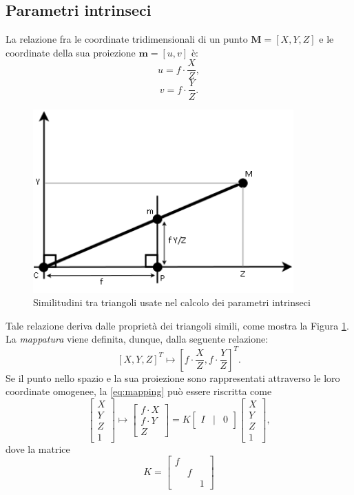 \subsection{Parametri intrinseci}
\label{intrinsicParam}
La relazione fra le coordinate tridimensionali di un punto $\textbf{M}=[X,Y,Z]$ e le coordinate della sua proiezione $\textbf{m}=[u,v]$ \`e:
\[u=f\cdot \frac{X}{Z},\]
\[v=f\cdot \frac{Y}{Z}.\]
\begin{figure}[tb]
	\centering
	\includegraphics[width=10cm]{./pictures/mappatura2d3d}
	\caption{Similitudini tra triangoli usate nel calcolo dei parametri intrinseci}
	\label{fig:mapping}
\end{figure}
\noindent Tale relazione deriva dalle propriet\`a dei triangoli simili, come mostra la Figura \ref{fig:mapping}.
La \textit{mappatura} viene definita, dunque, dalla seguente relazione:
\begin{equation}
\label{eq:mapping}
[X,Y,Z]^\textit{T} \mapsto \left[f\cdot \frac{X}{Z}, f\cdot \frac{Y}{Z}\right]^\textit{T}.
\end{equation} 
Se il punto nello spazio e la sua proiezione sono rappresentati attraverso le loro coordinate omogenee, la \eqref{eq:mapping} pu\`o essere riscritta come
\begin{equation}
\label{eq:mappingMatrix}
\left[\begin{array}{c}
X \\ Y \\ Z \\ 1
\end{array}\right] \mapsto 
\left[\begin{array}{c}
f \cdot X \\ f \cdot Y \\ Z
\end{array}\right] = 
K \left[\begin{array}{rcl}
I & | & 0
\end{array}\right]
\left[\begin{array}{c}
X \\ Y \\ Z \\ 1
\end{array}\right],
\end{equation}
dove la matrice
\begin{equation}
\label{eq:kSimple}
K = 
\left[\begin{array}{rccl}
f & & \\
& f & \\
& & 1 
\end{array}\right]
\end{equation}

